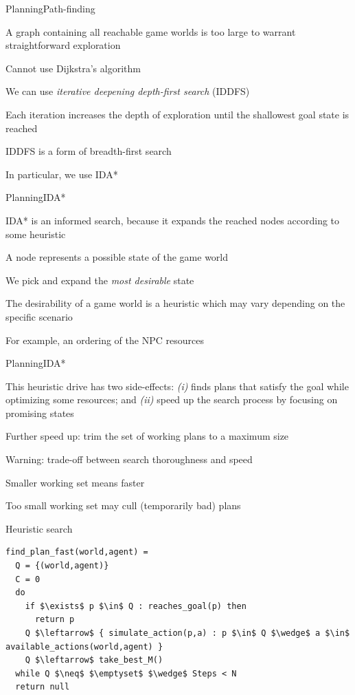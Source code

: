 \documentclass{beamer}
\begin{document}
\begin{slide}{Planning}{Path-finding}{
\item A graph containing all reachable game worlds is too large to warrant straightforward exploration
\item Cannot use Dijkstra's algorithm
\item We can use \textit{iterative deepening depth-first search} (IDDFS) \cite{IDDFS}
\item Each iteration increases the depth of exploration until the shallowest goal state is reached
\item IDDFS is a form of breadth-first search
\item In particular, we use IDA* \cite{IDAStar}
}\end{slide}

\begin{slide}{Planning}{IDA*}{
\item IDA* is an informed search, because it expands the reached nodes according to some heuristic
\item A node represents a possible state of the game world
\item We pick and expand the \textit{most desirable} state 
\item The desirability of a game world is a heuristic which may vary depending on the specific scenario
\item For example, an ordering of the NPC resources
}\end{slide}

\begin{slide}{Planning}{IDA*}{
\item This heuristic drive has two side-effects: \textit{(i)} finds plans that satisfy the goal while optimizing some resources; and \textit{(ii)} speed up the search process by focusing on promising states
\item Further speed up: trim the set of working plans to a maximum size
\item Warning: trade-off between search thoroughness and speed
\item Smaller working set means faster
\item Too small working set may cull (temporarily bad) plans
}\end{slide}

\begin{frame}[fragile]{Heuristic search}
\begin{lstlisting}
find_plan_fast(world,agent) =
  Q = {(world,agent)}
  C = 0
  do
    if $\exists$ p $\in$ Q : reaches_goal(p) then
      return p
    Q $\leftarrow$ { simulate_action(p,a) : p $\in$ Q $\wedge$ a $\in$ available_actions(world,agent) }
    Q $\leftarrow$ take_best_M()
  while Q $\neq$ $\emptyset$ $\wedge$ Steps < N
  return null
\end{lstlisting}
\end{frame}
\end{document}
